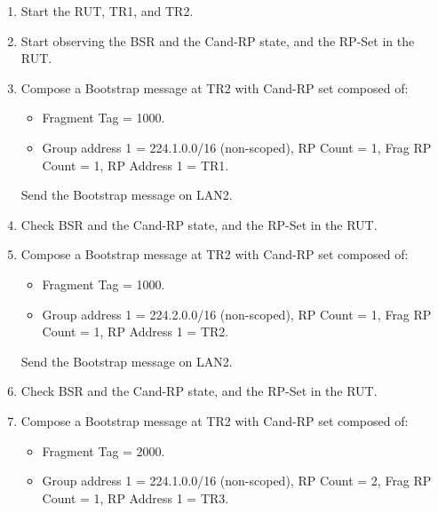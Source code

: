 \documentclass[11pt]{report}
\begin{document}
\begin{enumerate}

  \item Start the RUT, TR1, and TR2.

  \item Start observing the BSR and the Cand-RP state, and the RP-Set in the
  RUT.

  \item Compose a Bootstrap message at TR2 with Cand-RP set composed of:

  \begin{itemize}

    \item Fragment Tag = 1000.

    \item Group address 1 = 224.1.0.0/16 (non-scoped),
    RP Count = 1, Frag RP Count = 1, RP Address 1 = TR1.

  \end{itemize}

  Send the Bootstrap message on LAN2.

  \item Check BSR and the Cand-RP state, and the RP-Set in the RUT.

  \item Compose a Bootstrap message at TR2 with Cand-RP set composed of:

  \begin{itemize}

    \item Fragment Tag = 1000.

    \item Group address 1 = 224.2.0.0/16 (non-scoped),
    RP Count = 1, Frag RP Count = 1, RP Address 1 = TR2.

  \end{itemize}

  Send the Bootstrap message on LAN2.

  \item Check BSR and the Cand-RP state, and the RP-Set in the RUT.

  \item Compose a Bootstrap message at TR2 with Cand-RP set composed of:

  \begin{itemize}

    \item Fragment Tag = 2000.

    \item Group address 1 = 224.1.0.0/16 (non-scoped),
    RP Count = 2, Frag RP Count = 1, RP Address 1 = TR3.


\end{itemize}
\end{enumerate}
\end{document}
